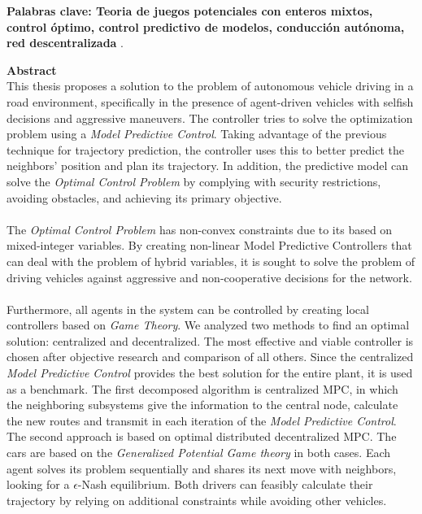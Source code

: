 \vspace{0.1cm}

\textbf{\small Palabras clave: Teoria de juegos potenciales con enteros mixtos, control óptimo, control predictivo de modelos, conducción autónoma, red descentralizada }.\vspace{1.5cm}

\newpage
 
\textbf{\LARGE Abstract}
\vspace{1.3cm}
\\
This thesis proposes a solution to the problem of autonomous vehicle driving in a road environment, specifically in the presence of agent-driven vehicles with selfish decisions and aggressive maneuvers. The controller tries to solve the optimization problem using a \textit{Model Predictive Control}. Taking advantage of the previous technique for trajectory prediction, the controller uses this to better predict the neighbors' position and plan its trajectory. In addition, the predictive model can solve the \textit{Optimal Control Problem} by complying with security restrictions, avoiding obstacles, and achieving its primary objective.
\\
\\
The \textit{Optimal Control Problem} has non-convex constraints due to its based on mixed-integer variables. By creating non-linear Model Predictive Controllers that can deal with the problem of hybrid variables, it is sought to solve the problem of driving vehicles against aggressive and non-cooperative decisions for the network.
\\
\\
Furthermore, all agents in the system can be controlled by creating local controllers based on \textit{Game Theory}. We analyzed two methods to find an optimal solution: centralized and decentralized. The most effective and viable controller is chosen after objective research and comparison of all others. Since the centralized \textit{Model Predictive Control} provides the best solution for the entire plant, it is used as a benchmark. The first decomposed algorithm is centralized MPC, in which the neighboring subsystems give the information to the central node, calculate the new routes and transmit in each iteration of the \textit{Model Predictive Control}. The second approach is based on optimal distributed decentralized MPC. The cars are based on the \textit{Generalized Potential Game theory} in both cases. Each agent solves its problem sequentially and shares its next move with neighbors, looking for a $\epsilon$-Nash equilibrium. Both drivers can feasibly calculate their trajectory by relying on additional constraints while avoiding other vehicles.

